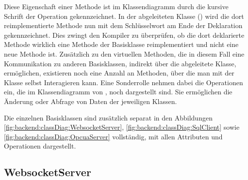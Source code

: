 Diese Eigenschaft einer Methode ist im Klassendiagramm durch die kursive Schrift der Operation gekennzeichnet.
In der abgeleiteten Klasse () wird die dort reimplementierte Methode nun mit dem Schlüsselwort  am Ende der Deklaration gekennzeichnet.
Dies zwingt den Kompiler zu überprüfen, ob die dort deklarierte Methode wirklich eine Methode der Basisklasse reimplementiert und nicht eine neue Methode ist.
Zusätzlich zu den virtuellen Methoden, die in diesem Fall eine Kommunikation zu anderen Basisklassen, indirekt über die abgeleitete Klasse, ermöglichen, existieren noch eine Anzahl an Methoden, 
über die man mit der Klasse selbst Interagieren kann.
Eine Sonderrolle nehmen dabei die Operationen ein, die im Klassendiagramm von , noch dargestellt sind.
Sie ermöglichen die Änderung oder Abfrage von Daten der jeweiligen Klassen.

Die einzelnen Basisklassen sind zusätzlich separat in den Abbildungen 
\ref{fig:backend:classDiag:WebsocketServer}, \ref{fig:backend:classDiag:SqlClient} sowie \ref{fig:backend:classDiag:OpcuaServer} 
vollständig, mit allen Attributen und Operationen dargestellt.
\subsection{WebsocketServer}

